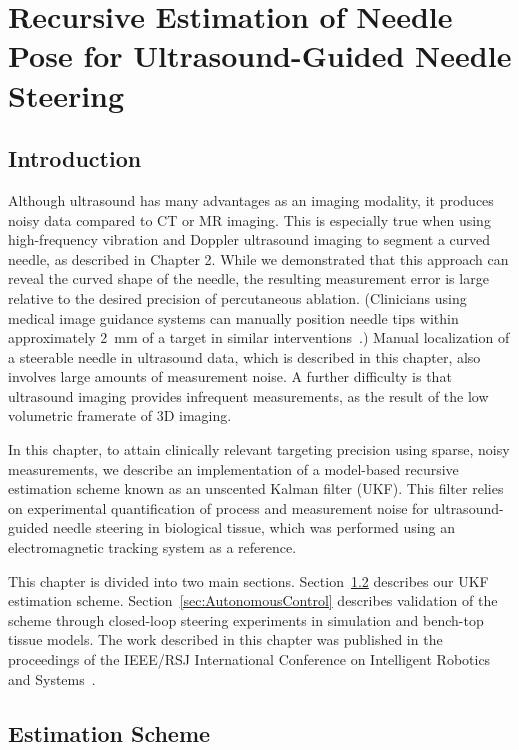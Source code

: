 \chapter[Recursive Estimation of Needle Pose]{Recursive Estimation of Needle Pose for Ultrasound-Guided Needle Steering}

\section{Introduction}
Although ultrasound has many advantages as an imaging modality, it produces noisy data compared to CT or MR imaging. This is especially true when using high-frequency vibration and Doppler ultrasound imaging to segment a curved needle, as described in Chapter 2. While we demonstrated that this approach can reveal the curved shape of the needle, the resulting measurement error is large relative to the desired precision of percutaneous ablation. (Clinicians using medical image guidance systems can manually position needle tips within approximately 2~mm of a target in similar interventions~\cite{Crocetti2008}.) Manual localization of a steerable needle in ultrasound data, which is described in this chapter, also involves large amounts of measurement noise. A further difficulty is that ultrasound imaging provides infrequent measurements, as the result of the low volumetric framerate of 3D imaging. 

In this chapter, to attain clinically relevant targeting precision using sparse, noisy measurements, we describe an implementation of a model-based recursive estimation scheme known as an unscented Kalman filter (UKF). This filter relies on experimental quantification of process and measurement noise for ultrasound-guided needle steering in biological tissue, which was performed using an electromagnetic tracking system as a reference.
 
This chapter is divided into two main sections. Section~\ref{sec:UKF} describes our UKF estimation scheme. Section~\ref{sec:AutonomousControl} describes validation of the scheme through closed-loop steering experiments in simulation and bench-top tissue models. The work described in this chapter was published in the proceedings of the IEEE/RSJ International Conference on Intelligent Robotics and Systems~\cite{Adebar2014a}.

\section{Estimation Scheme}
\label{sec:UKF}
